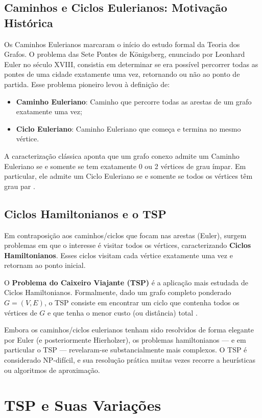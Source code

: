 \documentclass[12pt, a4paper]{report}
\begin{document}
\section{Caminhos e Ciclos Eulerianos: Motivação Histórica}
Os Caminhos Eulerianos marcaram o início do estudo formal da Teoria dos Grafos. O problema das Sete Pontes de Königsberg, enunciado por Leonhard Euler no século XVIII, consistia em determinar se era possível percorrer todas as pontes de uma cidade exatamente uma vez, retornando ou não ao ponto de partida. Esse problema pioneiro levou à definição de:
\begin{itemize}
    \item \textbf{Caminho Euleriano}: Caminho que percorre todas as arestas de um grafo exatamente uma vez;
    \item \textbf{Ciclo Euleriano}: Caminho Euleriano que começa e termina no mesmo vértice.
\end{itemize}

A caracterização clássica aponta que um grafo conexo admite um Caminho Euleriano se e somente se tem exatamente 0 ou 2 vértices de grau ímpar. Em particular, ele admite um Ciclo Euleriano se e somente se todos os vértices têm grau par \cite{carnielli}.

\section{Ciclos Hamiltonianos e o TSP}
Em contraposição aos caminhos/ciclos que focam nas arestas (Euler), surgem problemas em que o interesse é visitar todos os vértices, caracterizando \textbf{Ciclos Hamiltonianos}. Esses ciclos visitam cada vértice exatamente uma vez e retornam ao ponto inicial. 

O \textbf{Problema do Caixeiro Viajante (TSP)} é a aplicação mais estudada de Ciclos Hamiltonianos. Formalmente, dado um grafo completo ponderado $G=(V,E)$, o TSP consiste em encontrar um ciclo que contenha todos os vértices de $G$ e que tenha o menor custo (ou distância) total \cite{machado}.

Embora os caminhos/ciclos eulerianos tenham sido resolvidos de forma elegante por Euler (e posteriormente Hierholzer), os problemas hamiltonianos — e em particular o TSP — revelaram-se substancialmente mais complexos. O TSP é considerado NP-difícil, e sua resolução prática muitas vezes recorre a heurísticas ou algoritmos de aproximação.

\chapter{TSP e Suas Variações}
\end{document}
